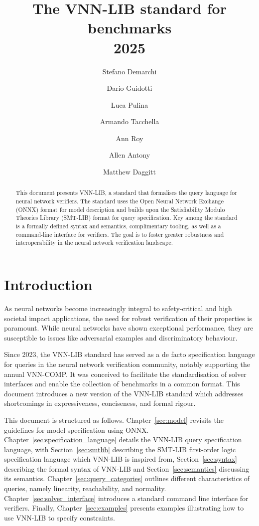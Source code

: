 \documentclass[12pt,a4paper]{report}
\title{The VNN-LIB standard for benchmarks\\2025}
\author[1]{Stefano Demarchi}
\author[2]{Dario Guidotti}
\author[2]{Luca Pulina}
\author[1]{Armando Tacchella}
\author[3]{Ann Roy}
\author[3]{Allen Antony}
\author[3]{Matthew Daggitt}
\affil[1]{University of Genoa, Viale Causa 13, 16145 Genoa, Italy}
\affil[2]{University of Sassari, Via Roma 151, 07100 Sassari, Italy}
\affil[3]{University of Western Australia, 35 Stirling Hwy, Crawley WA 6009, Australia}
\begin{document}
\maketitle

\begin{abstract}
This document presents VNN-LIB, a standard that formalises the query language for neural network verifiers. The standard uses the 
Open Neural Network Exchange (ONNX) format for model description and builds upon the Satisfiability Modulo Theories Library (SMT-LIB) 
format for query specification. Key among the standard is a formally defined syntax and semantics, complimentary tooling, as well as a 
command-line interface for verifiers. The goal is to foster greater robustness and interoperability in the neural network verification 
landscape.
\end{abstract}


\section*{Introduction}

As neural networks become increasingly integral to safety-critical and high societal impact applications\cite{1, 2, 3}, 
the need for robust verification of their properties is paramount. While neural networks have shown exceptional performance, 
they are susceptible to issues like adversarial examples\cite{3} and discriminatory behaviour\cite{4}.

Since 2023, the VNN-LIB standard\cite{5} has served as a de facto specification language for queries in the neural network verification 
community, notably supporting the annual VNN-COMP\cite{7}. It was conceived to facilitate the standardisation of solver interfaces and 
enable the collection of benchmarks in a common format. This document introduces a new version of the VNN-LIB standard which addresses 
shortcomings in expressiveness, conciseness, and formal rigour\cite{5, 7}.

This document is structured as follows. Chapter~\ref{sec:model} revisits the guidelines for model specification using ONNX.\@
Chapter~\ref{sec:specification_language} details the VNN-LIB query specification language, with Section~\ref{sec:smtlib} describing the 
SMT-LIB first-order logic specification language which VNN-LIB is inspired from, Section~\ref{sec:syntax} describing the formal syntax of VNN-LIB and 
Section~\ref{sec:semantics} discussing its semantics. Chapter~\ref{sec:query_categories} outlines different characteristics of queries, namely linearity, 
reachability, and normality. Chapter~\ref{sec:solver_interface} introduces a standard command line interface for verifiers. Finally, Chapter~\ref{sec:examples} 
presents examples illustrating how to use VNN-LIB to specify constraints.
\end{document}
